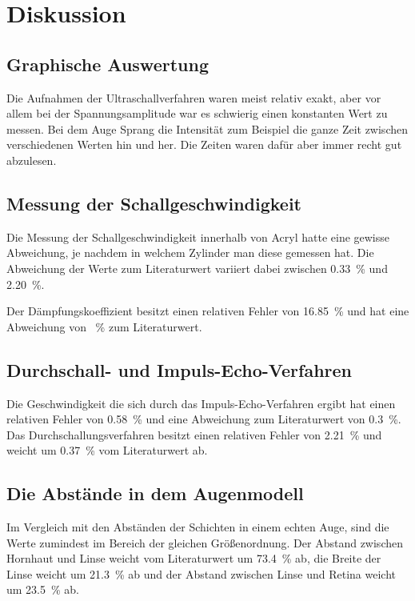 \section{Diskussion}
\label{sec:Diskussion}

\subsection{Graphische Auswertung}
Die Aufnahmen der Ultraschallverfahren waren meist relativ exakt, aber vor allem bei der Spannungsamplitude war es schwierig einen konstanten Wert zu messen. Bei dem Auge Sprang die Intensität zum Beispiel die ganze Zeit zwischen verschiedenen Werten hin und her. Die Zeiten waren dafür aber immer recht gut abzulesen. 
\subsection{Messung der Schallgeschwindigkeit}
Die Messung der Schallgeschwindigkeit innerhalb von Acryl hatte eine gewisse Abweichung, je nachdem in welchem Zylinder man diese gemessen hat. Die Abweichung der Werte zum Literaturwert variiert dabei zwischen \SI{0.33}{\percent} und \SI{2.20}{\percent}. 

Der Dämpfungskoeffizient besitzt einen relativen Fehler von \SI{16.85}{\percent} und hat eine Abweichung von \SI{}{\percent} zum Literaturwert. 

\subsection{Durchschall- und Impuls-Echo-Verfahren} 
Die Geschwindigkeit die sich durch das Impuls-Echo-Verfahren ergibt hat einen relativen Fehler von \SI{0.58}{\percent} und eine Abweichung zum Literaturwert von \SI{0.3}{\percent}. Das Durchschallungsverfahren besitzt einen relativen Fehler von \SI{2.21}{\percent} und weicht um \SI{0.37}{\percent} vom Literaturwert ab.

\subsection{Die Abstände in dem Augenmodell}
Im Vergleich mit den Abständen der Schichten in einem echten Auge, sind die Werte zumindest im Bereich der gleichen Größenordnung. 
Der Abstand zwischen Hornhaut und Linse weicht vom Literaturwert um \SI{73.4}{\percent} ab, die Breite der Linse weicht um \SI{21.3}{\percent} ab und der Abstand zwischen Linse und Retina weicht um \SI{23.5}{\percent} ab.
